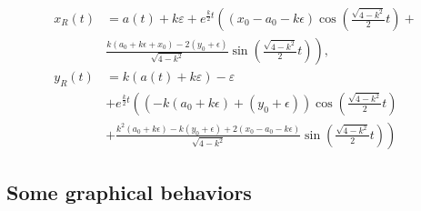 \documentclass[a4paper,preprint,11pt]{article}
\begin{document}
\begin{align*}
x_R(t)&=a(t)+k\varepsilon+
  e^{\frac {k}{2}t} \left(
      (x_0-a_0-k\epsilon) \cos\left(\frac {\sqrt{4-k^2}}2t \right)+\right. \\
      & \left. \frac{k(a_0+k\epsilon+x_0)-2(y_0+\epsilon)}{\sqrt{4-k^2}} \sin\left(\frac {\sqrt{4-k^2}}2t \right)
    \right),\\
y_R(t)&=k(a(t)+k\varepsilon)-\varepsilon\\
  &+e^{\frac {k}{2}t} \left(
      (-k(a_0+k\epsilon)+(y_0+\epsilon))\cos\left(\frac {\sqrt{4-k^2}}2t \right) \right. \\
      & \left. +\frac{k^2(a_0+k\epsilon)-k(y_0+\epsilon)+2(x_0-a_0-k\epsilon)}{\sqrt{4-k^2}} \sin\left(\frac {\sqrt{4-k^2}}2t \right)
    \right)
\end{align*}


\subsection{Some graphical behaviors}
\end{document}
